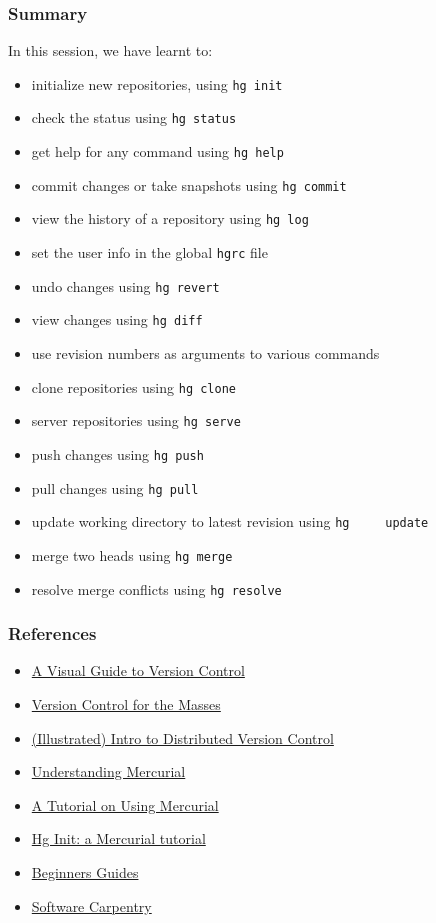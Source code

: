 \documentclass[14pt,compress]{beamer}
\newcommand{\typ}[1]{\lstinline{#1}}
\begin{document}
\begin{frame}
  \frametitle{Summary}
  In this session, we have learnt to: 
  \begin{itemize}
  \item initialize new repositories, using \typ{hg init}
  \item check the status using \typ{hg status}
  \item get help for any command using \typ{hg help}
  \item commit changes or take snapshots using \typ{hg commit}
  \item view the history of a repository using \typ{hg log}
  \item set the user info in the global \typ{hgrc} file
  \item undo changes using \typ{hg revert}
  \item view changes using \typ{hg diff}
  \item use revision numbers as arguments to various commands
  \item clone repositories using \typ{hg clone}
  \item server repositories using \typ{hg serve}
  \item push changes using \typ{hg push}
  \item pull changes using \typ{hg pull}
  \item update working directory to latest revision using \typ{hg
    update}
  \item merge two heads using \typ{hg merge}
  \item resolve merge conflicts using \typ{hg resolve}
  \end{itemize}
\end{frame}


\begin{frame}
  \frametitle{References}
  \begin{itemize}
  \item \href{http://betterexplained.com/articles/a-visual-guide-to-version-control/}{A Visual Guide to Version Control}
  \item \href{http://karlagius.com/2009/01/09/version-control-for-the-masses/}{Version Control for the Masses}
  \item \href{http://betterexplained.com/articles/intro-to-distributed-version-control-illustrated/}{(Illustrated) Intro to Distributed Version Control}
  \item \href{http://mercurial.selenic.com/wiki/UnderstandingMercurial}{Understanding Mercurial}
  \item \href{http://mercurial.selenic.com/wiki/Tutorial}{A Tutorial on Using Mercurial}
  \item \href{http://hginit.com/}{Hg Init: a Mercurial tutorial}
  \item \href{http://mercurial.selenic.com/wiki/BeginnersGuides}{Beginners Guides}
  \item \href{http://software-carpentry.org/4_0/vc/}{Software Carpentry}
  \end{itemize}
\end{frame}
\end{document}
